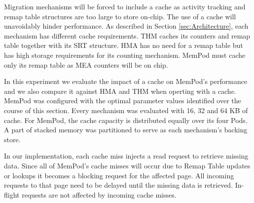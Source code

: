 Migration mechanisms will be forced to include a cache as activity tracking and remap table structures are too large to store on-chip. The use of a cache will unavoidably hinder performance. As described in Section \ref{sec:Architecture}, each mechanism has different cache requirements. THM caches its counters and remap table together with its SRT structure. HMA has no need for a remap table but has high storage requirements for its counting mechanism. MemPod must cache only its remap table as MEA counters will be on chip. 

In this experiment we evaluate the impact of a cache on MemPod's performance and we also compare it against HMA and THM when operting with a cache. MemPod was configured with the optimal parameter values identified over the course of this section. Every mechanism was evaluated with 16, 32 and 64 KB of cache. For MemPod, the cache capacity is distributed equally over its four Pods. A part of stacked memory was partitioned to serve as each mechanism's backing store.

In our implementation, each cache miss injects a read request to retrieve missing data. Since all of MemPod's cache misses will occur due to Remap Table updates or lookups it becomes a blocking request for the affected page. All incoming requests to that page need to be delayed until the missing data is retrieved. In-flight requests are not affected by incoming cache misses.

